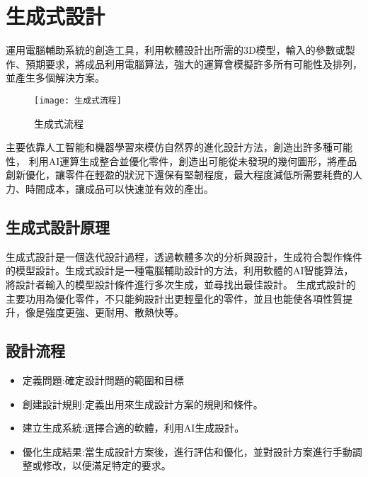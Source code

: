 \chapter{生成式設計}
運用電腦輔助系統的創造工具，利用軟體設計出所需的3D模型，輸入的參數或製作、預期要求，將成品利用電腦算法，強大的運算會模擬許多所有可能性及排列，並產生多個解決方案。\\

\begin{figure}[hbt!]
\center
\texttt{[image: 生成式流程]}
\caption{\Large 生成式流程}
\label{生成式流程}
\end{figure}


主要依靠人工智能和機器學習來模仿自然界的進化設計方法，創造出許多種可能性，
利用AI運算生成整合並優化零件，創造出可能從未發現的幾何圖形，將產品創新優化，讓零件在輕盈的狀況下還保有堅韌程度，最大程度減低所需要耗費的人力、時間成本，讓成品可以快速並有效的產出。\\

\section{生成式設計原理}
生成式設計是一個迭代設計過程，透過軟體多次的分析與設計，生成符合製作條件的模型設計。生成式設計是一種電腦輔助設計的方法，利用軟體的AI智能算法，將設計者輸入的模型設計條件進行多次生成，並尋找出最佳設計。
生成式設計的主要功用為優化零件，不只能夠設計出更輕量化的零件，並且也能使各項性質提升，像是強度更強、更耐用、散熱快等。\\

\section{設計流程}
\begin{itemize}
\item 定義問題:確定設計問題的範圍和目標
\item 創建設計規則:定義出用來生成設計方案的規則和條件。
\item	建立生成系統:選擇合適的軟體，利用AI生成設計。
\item 優化生成結果:當生成設計方案後，進行評估和優化，並對設計方案進行手動調整或修改，以便滿足特定的要求。\\

\end{itemize}

